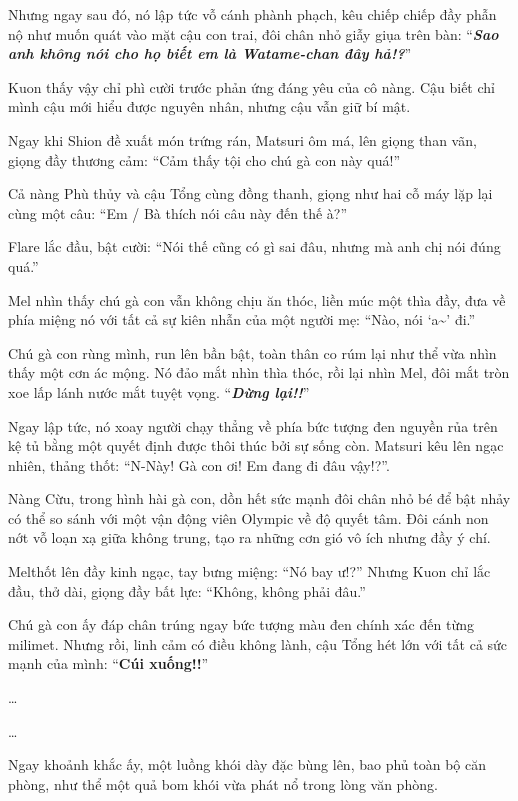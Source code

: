 \documentclass[../main.tex]{subfiles}
\begin{document}
Nhưng ngay sau đó, nó lập tức vỗ cánh phành phạch, kêu chiếp chiếp đầy phẫn nộ như muốn quát vào mặt cậu con trai, đôi chân nhỏ giẫy giụa trên bàn:
``\textit{\textbf{Sao anh không nói cho họ biết em là Watame-chan đây hả!?}}''

Kuon thấy vậy chỉ phì cười trước phản ứng đáng yêu của cô nàng. Cậu biết chỉ mình cậu mới hiểu được nguyên nhân, nhưng cậu vẫn giữ bí mật.

Ngay khi Shion đề xuất món trứng rán, Matsuri ôm má, lên giọng than vãn, giọng đầy thương cảm: ``Cảm thấy tội cho chú gà con này quá!''

Cả nàng Phù thủy và cậu Tổng cùng đồng thanh, giọng như hai cỗ máy lặp lại cùng một câu: ``Em / Bà thích nói câu này đến thế à?''

Flare lắc đầu, bật cười: ``Nói thế cũng có gì sai đâu, nhưng mà anh chị nói đúng quá.''

Mel nhìn thấy chú gà con vẫn không chịu ăn thóc, liền múc một thìa đầy, đưa về phía miệng nó với tất cả sự kiên nhẫn của một người mẹ: ``Nào, nói `a\~{}' đi.''

Chú gà con rùng mình, run lên bần bật, toàn thân co rúm lại như thể vừa nhìn thấy một cơn ác mộng. Nó đảo mắt nhìn thìa thóc, rồi lại nhìn Mel, đôi mắt tròn xoe lấp lánh nước mắt tuyệt vọng. ``\textbf{\textit{Dừng lại!!}}''

Ngay lập tức, nó xoay người chạy thẳng về phía bức tượng đen nguyền rủa trên kệ tủ bằng một quyết định được thôi thúc bởi sự sống còn. Matsuri kêu lên ngạc nhiên, thảng thốt: ``N-Này! Gà con ơi! Em đang đi đâu vậy!?''.

Nàng Cừu, trong hình hài gà con, dồn hết sức mạnh đôi chân nhỏ bé để bật nhảy có thể so sánh với một vận động viên Olympic về độ quyết tâm. Đôi cánh non nớt vỗ loạn xạ giữa không trung, tạo ra những cơn gió vô ích nhưng đầy ý chí.


Melthốt lên đầy kinh ngạc, tay bưng miệng: ``Nó bay ư!?'' Nhưng Kuon chỉ lắc đầu, thở dài, giọng đầy bất lực: ``Không, không phải đâu.''

Chú gà con ấy đáp chân trúng ngay bức tượng màu đen chính xác đến từng milimet. Nhưng rồi, linh cảm có điều không lành, cậu Tổng hét lớn với tất cả sức mạnh của mình: ``\textbf{Cúi xuống!!}''

\dots

\dots

Ngay khoảnh khắc ấy, một luồng khói dày đặc bùng lên, bao phủ toàn bộ căn phòng, như thể một quả bom khói vừa phát nổ trong lòng văn phòng.
\end{document}
